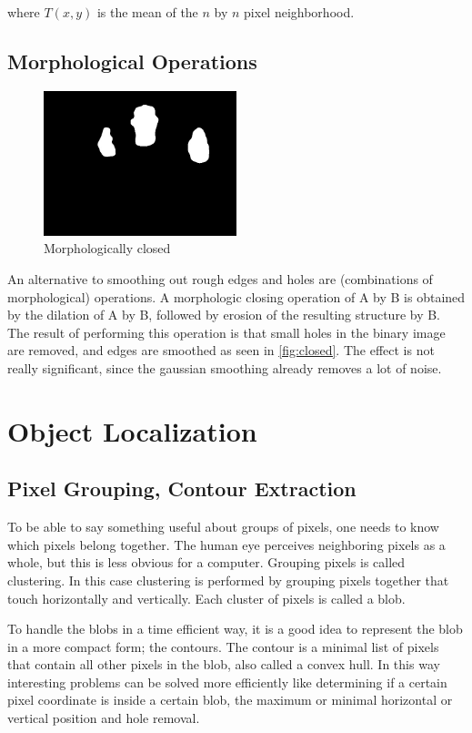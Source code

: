 where $T(x,y)$ is the mean of the $n$ by $n$ pixel neighborhood.

\subsection*{Morphological Operations}

\begin{figure}[tb]
    \center{}
    \includegraphics[width=0.5\textwidth]{figures/pipeline/closed.jpg}
	\caption{Morphologically closed}
	\label{fig:closed}
\end{figure}

An alternative to smoothing out rough edges and holes are (combinations of morphological) operations.  A morphologic closing operation of A by B is obtained by the dilation of A by B, followed by erosion of the resulting structure by B. The result of performing this operation is that small holes in the binary image are removed, and edges are smoothed as seen in \autoref{fig:closed}. The effect is not really significant, since the gaussian smoothing already removes a lot of noise. 


\section{Object Localization}

\subsection*{Pixel Grouping, Contour Extraction}
To be able to say something useful about groups of pixels, one needs to know which pixels belong together. The human eye perceives neighboring pixels as a whole, but this is less obvious for a computer. Grouping pixels is called clustering. In this case clustering is performed by grouping pixels together that touch horizontally and vertically. Each cluster of pixels is called a blob.

To handle the blobs in a time efficient way, it is a good idea to represent the blob in a more compact form; the contours. The contour is a minimal list of pixels that contain all other pixels in the blob, also called a convex hull. In this way interesting problems can be solved more efficiently like determining if a certain pixel coordinate is inside a certain blob, the maximum or minimal horizontal or vertical position and hole removal.

